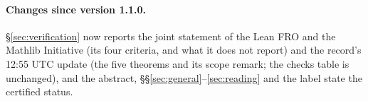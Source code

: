 \paragraph{Changes since version 1.1.0.} \S\ref{sec:verification} now reports the joint statement
of the Lean FRO and the Mathlib Initiative \cite{leanfro-mathlib} (its four criteria, and what it
does not report) and the record's 12:55 UTC update \cite{sutherland-1255} (the five theorems and its
scope remark; the checks table is unchanged), and the abstract, \S\S\ref{sec:general}--\ref{sec:reading}
and the  label state the certified status.
